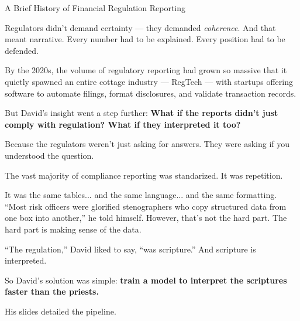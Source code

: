 \begin{HistoricalSidebar}{A Brief History of Financial Regulation Reporting}
    \medskip
    
    Regulators didn’t demand certainty — they demanded \textit{coherence}. And that meant narrative. Every 
    number had to be explained. Every position had to be defended.
    
    \medskip
    
    By the 2020s, the volume of regulatory reporting had grown so massive that it quietly spawned an entire 
    cottage industry — RegTech — with startups offering software to automate filings, format disclosures, and 
    validate transaction records.
    
    \medskip
    
    But David’s insight went a step further:
    \textbf{What if the reports didn’t just comply with regulation? What if they interpreted it too?}

    \medskip
    
    Because the regulators weren’t just asking for answers.
    They were asking if you understood the question.

\end{HistoricalSidebar}

\medskip

The vast majority of compliance reporting was standarized. 
It was repetition.

It was the same tables... and the same language...  and the same formatting.
``Most risk officers were glorified stenographers who copy structured data from one box into another,''
he told himself.
However, that's not the hard part. The hard part is making sense of the data.

``The regulation,'' David liked to say, ``was scripture.''
And scripture is interpreted.

So David's solution was simple:
\textbf{train a model to interpret the scriptures faster than the priests.}

His slides detailed the pipeline.

\medskip

